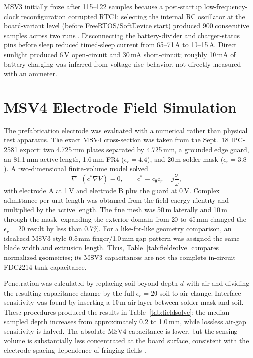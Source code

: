 \documentclass[conference]{IEEEtran}
\begin{document}
MSV3 initially froze after 115--122 samples because a post-startup low-frequency-clock
reconfiguration corrupted RTC1; selecting the internal RC oscillator at the board-variant level
(before FreeRTOS/SoftDevice start) produced 900 consecutive samples across two runs
\cite{project_lfclk_hang}. Disconnecting the battery-divider and charger-status pins before sleep
reduced timed-sleep current from 65--71\,\textmu A to 10--15\,\textmu A. Direct sunlight produced
6\,V open-circuit and 30\,mA short-circuit; roughly 10\,mA of battery charging was inferred from
voltage-rise behavior, not directly measured with an ammeter.

\section{MSV4 Electrode Field Simulation}
The prefabrication electrode was evaluated with a numerical rather than physical test apparatus.
The exact MSV4 cross-section was taken from the Sept.~18 IPC-2581 export: two 4.725\,mm plates
separated by 4.725\,mm, a grounded edge guard, an 81.1\,mm active length, 1.6\,mm FR4
($\epsilon_r=4.4$), and 20\,\textmu m solder mask ($\epsilon_r=3.8$). A two-dimensional
finite-volume model solved
\begin{equation}
 \nabla\!\cdot\!\left(\epsilon^*\nabla V\right)=0, \qquad
 \epsilon^*=\epsilon_0\epsilon_r-j\frac{\sigma}{\omega},
\end{equation}
with electrode A at 1\,V and electrode B plus the guard at 0\,V. Complex admittance per unit length
was obtained from the field-energy identity and multiplied by the active length. The fine mesh was
50\,\textmu m laterally and 10\,\textmu m through the mask; expanding the exterior domain from
20 to 45\,mm changed the $\epsilon_r=20$ result by less than 0.7\%. For a like-for-like geometry
comparison, an idealized MSV3-style 0.5\,mm-finger/1.0\,mm-gap pattern was assigned the same blade
width and extrusion length. Thus, Table~\ref{tab:fieldsolve} compares normalized geometries; its
MSV3 capacitances are not the complete in-circuit FDC2214 tank capacitance.

Penetration was calculated by replacing soil beyond depth $d$ with air and dividing the resulting
capacitance change by the full $\epsilon_r=20$ soil-to-air change. Interface sensitivity was found
by inserting a 10\,\textmu m air layer between solder mask and soil. These procedures produced the
results in Table~\ref{tab:fieldsolve}; the median sampled depth increases from approximately
0.2 to 1.0\,mm, while lossless air-gap sensitivity is halved. The absolute MSV4 capacitance is lower,
but the sensing volume is substantially less concentrated at the board surface, consistent with
the electrode-spacing dependence of fringing fields \cite{mamishev2004}.
\end{document}
